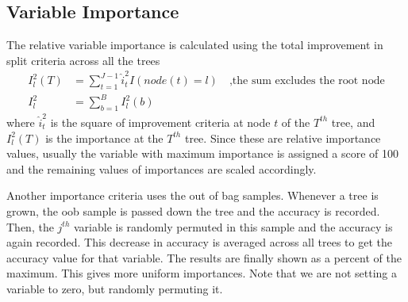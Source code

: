 \documentclass[../statistical_learning_notes.tex]{subfiles}
\begin{document}
    \subsection{Variable Importance}
    The relative variable importance is calculated using the total improvement in split criteria across all the trees
    \begin{align*}
        I_{l}^{2}(T) &= \sum_{t=1}^{J-1} \hat{i}_{t}^{2}I(node(t) = l) \quad \text{,the sum excludes the root node}\\
        I_{l}^{2} &= \sum_{b=1}^{B} I_{l}^{2}(b)
    \end{align*}
    where $\hat{i}_{t}^{2}$ is the square of improvement criteria at node $t$ of the $T^{th}$ tree, and $I_{l}^{2}(T)$ is the importance at the $T^{th}$ tree. Since these are relative importance values, usually the variable with maximum importance is assigned a score of 100 and the remaining values of importances are scaled accordingly.\newline

    Another importance criteria uses the out of bag samples. Whenever a tree is grown, the oob sample is passed down the tree and the accuracy is recorded. Then, the $j^{th}$ variable is randomly permuted in this sample and the accuracy is again recorded. This decrease in accuracy is averaged across all trees to get the accuracy value for that variable. The results are finally shown as a percent of the maximum. This gives more uniform importances. Note that we are not setting a variable to zero, but randomly permuting it.
\end{document}
